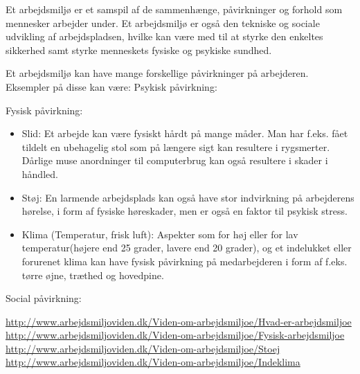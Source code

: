 \documentclass[11pt, twoside, a4paper, openright]{report}
\begin{document}
Et arbejdsmiljø er et samspil af de sammenhænge, påvirkninger og forhold som mennesker arbejder under. Et arbejdsmiljø er også den tekniske og sociale udvikling af arbejdspladsen, hvilke kan være med til at styrke den enkeltes sikkerhed samt styrke menneskets fysiske og psykiske sundhed.

Et arbejdsmiljø kan have mange forskellige påvirkninger på arbejderen. Eksempler på disse kan være: 
Psykisk påvirkning:

Fysisk påvirkning:
\begin{itemize}

\item Slid: Et arbejde kan være fysiskt hårdt på mange måder. Man har f.eks. fået tildelt en ubehagelig stol som på længere sigt kan resultere i rygsmerter. Dårlige muse anordninger til computerbrug kan også resultere i skader i håndled. 
\item Støj: En larmende arbejdsplads kan også have stor indvirkning på arbejderens hørelse, i form af fysiske høreskader, men er også en faktor til psykisk stress.
\item Klima (Temperatur, frisk luft): Aspekter som for høj eller for lav temperatur(højere end 25 grader, lavere end 20 grader), og et indelukket eller forurenet klima kan have fysisk påvirkning på medarbejderen i form af f.eks. tørre øjne, træthed og hovedpine. 
\end{itemize} 
Social påvirkning:

\url{http://www.arbejdsmiljoviden.dk/Viden-om-arbejdsmiljoe/Hvad-er-arbejdsmiljoe}
\url{http://www.arbejdsmiljoviden.dk/Viden-om-arbejdsmiljoe/Fysisk-arbejdsmiljoe}
\url{http://www.arbejdsmiljoviden.dk/Viden-om-arbejdsmiljoe/Stoej}
\url{http://www.arbejdsmiljoviden.dk/Viden-om-arbejdsmiljoe/Indeklima}

\newpage
\end{document}
